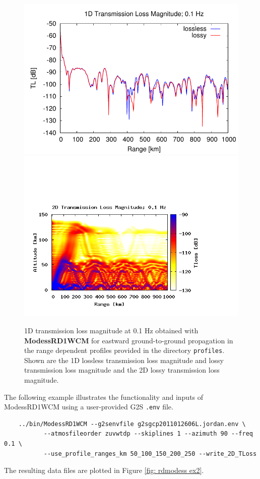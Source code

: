 \begin{figure}[h]
\begin{center}
\includegraphics[scale=0.60]{figs/rdmodess_ex1_1d}
\includegraphics[scale=0.45,trim = 20 20 110 140,clip]{figs/rdmodess_ex1_2d.png}
\end{center}
\caption{1D transmission loss magnitude at 0.1 Hz obtained with {\bf ModessRD1WCM} for eastward ground-to-ground propagation in the range dependent profiles provided in the directory {\tt profiles}. Shown are the 1D lossless transmission loss magnitude and lossy transmission loss magnitude and the 2D lossy transmission loss magnitude.}
\label{fig: rdmodess ex1}
\end{figure}

The following example illustrates the functionality and inputs of ModessRD1WCM using a user-provided G2S {\tt .env} file. 
\begin{verbatim}
    ../bin/ModessRD1WCM --g2senvfile g2sgcp2011012606L.jordan.env \
           --atmosfileorder zuvwtdp --skiplines 1 --azimuth 90 --freq 0.1 \
           --use_profile_ranges_km 50_100_150_200_250 --write_2D_TLoss
\end{verbatim}
The resulting data files are plotted in Figure \ref{fig: rdmodess ex2}. 

